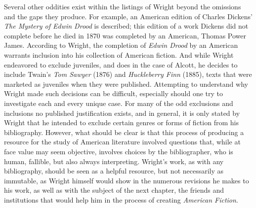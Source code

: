 Several other oddities exist within the listings of Wright beyond the omissions and the gaps they produce. For example, an American edition of Charles Dickens'  \textit{The Mystery of Edwin Drood} is described; this edition of a work Dickens did not complete before he died in 1870 was completed by an American, Thomas Power James. According to Wright, the completion of \textit{Edwin Drood} by an American warrants inclusion into his collection of American fiction.\autocite[422]{wright_american_1957} And while Wright endeavored to exclude juveniles, and does in the case of Alcott, he decides to include Twain's \textit{Tom Sawyer} (1876) and \textit{Huckleberry Finn} (1885), texts that were marketed as juveniles when they were published.\autocite[109, 111]{wright_american_1966} Attempting to understand why Wright made such decisions can be difficult, especially should one try to investigate each and every unique case. For many of the odd exclusions and inclusions no published justification exists, and in general, it is only stated by Wright that he intended to exclude certain genres or forms of fiction from his bibliography. However, what should be clear is that this process of producing a resource for the study of American literature involved questions that, while at face value may seem objective, involves choices by the bibliographer, who is human, fallible, but also always interpreting. Wright's work, as with any bibliography, should be seen as a helpful resource, but not necessarily as immutable, as Wright himself would show in the numerous revisions he makes to his work, as well as with the subject of the next chapter, the friends and institutions that would help him in the process of creating \textit{American Fiction}.